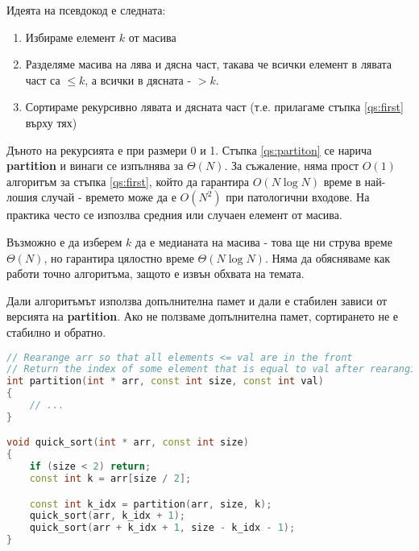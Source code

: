 \documentclass[fleqn,12pt]{article}
\begin{document}
Идеята на псевдокод е следната:
\begin{enumerate}
    \item \label{qs:first} Избираме елемент $k$ от масива
    \item \label{qs:partiton} Разделяме масива на лява и дясна част, такава че всички елемент в лявата част са $\leq k$, а всички в дясната - $> k$.
    \item Сортираме рекурсивно лявата и дясната част (т.е. прилагаме стъпка \ref{qs:first} върху тях)
\end{enumerate}

Дъното на рекурсията е при размери 0 и 1. Стъпка \ref{qs:partiton} се нарича \textbf{partition} и винаги се изпълнява за $\Theta(N)$.
За съжаление, няма прост $O(1)$ алгоритъм за стъпка \ref{qs:first}, който да гарантира $O(N \log N)$ време в най-лошия случай - времето може да е $O(N^2)$
при патологични входове. На практика често се изпозлва средния или случаен елемент от масива.

Възможно е да изберем $k$ да е медианата на масива - това ще ни струва време $\Theta(N)$, но гарантира цялостно време $\Theta(N \log N)$.
Няма да обясняваме как работи точно алгоритъма, защото е извън обхвата на темата.

Дали алгоритъмът използва допълнителна памет и дали е стабилен зависи от версията на \textbf{partition}. Ако не ползваме допълнителна памет,
сортирането не е стабилно и обратно.

\begin{lstlisting}[language=C++, caption=QuickSort]
// Rearange arr so that all elements <= val are in the front
// Return the index of some element that is equal to val after rearanging
int partition(int * arr, const int size, const int val)
{
    // ...
}

void quick_sort(int * arr, const int size)
{
    if (size < 2) return;
    const int k = arr[size / 2];

    const int k_idx = partition(arr, size, k);
    quick_sort(arr, k_idx + 1);
    quick_sort(arr + k_idx + 1, size - k_idx - 1);
}
\end{lstlisting}
\end{document}
